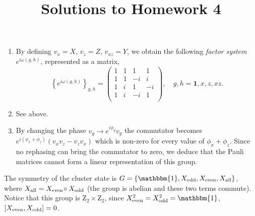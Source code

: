 \documentclass[a4paper,10pt,twoside]{article}
\def \id {{\mathbbm{1}}}
\theoremstyle{modern}
\begin{document}
\title{\vspace{-1cm}\sffamily Solutions to Homework 4\vspace{-1cm}}
\author{}
\date{}
\maketitle
\thispagestyle{fancy}

\begin{section}{}
\begin{enumerate}[label=(\alph*)]
\item By defining $v_x = X$, $v_z = Z$, $v_{xz} = Y$,
we obtain the following \emph{factor system} $e^{i \omega(g,h)}$, represented as a matrix,
\[
  \left\{e^{i \omega(g,h)}\right\}_{g,h} = 
  \begin{pmatrix}
    1 & 1 & 1 & 1 \\
    1 & 1 & -i & i \\
    1 & i & 1 & -i \\
    1 & i & -i & 1 \\
  \end{pmatrix}, \quad g,h = \mathbf{1},x,z,{xz} .
\]
\item See above.
\item By changing the phase $v_g \to e^{i\phi_g} v_g$ the commutator becomes $e^{i (\phi_x + \phi_z)}(v_x v_z - v_z v_x)$ which is non-zero for every value of $\phi_x + \phi_z$.
Since no rephasing can bring the commutator to zero, we deduce that the Pauli matrices cannot form a linear representation of this group.
\end{enumerate}
The symmetry of the cluster state is $G = \{ \id, X_{\rm odd}, X_{\rm even}, X_{\rm all}\}$, where $X_{\rm all} = X_{\rm even} \!\circ X_{\rm odd}$ (the group is abelian and these two terms commute). Notice that this group is $\mathrm{Z}_2 \times \mathrm{Z}_2$, since $X_{\rm even}^2 = X_{\rm odd}^2 = \id$, $[X_{\rm even} , X_{\rm odd}] = 0$.


\end{section}
\end{document}
